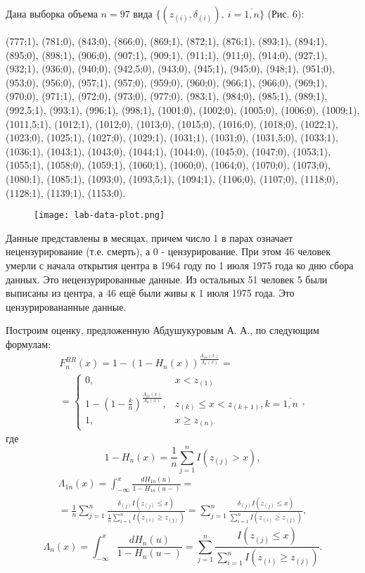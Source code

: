 Дана выборка объема $n = 97$ вида $\{(z_{(i)}, \delta_{(i)}),\ i=\overline{1,n}\}$ (Рис. 6):

(777;1), (781;0), (843;0), (866;0), (869;1), (872;1), (876;1), (893;1), (894;1), (895;0), (898;1), (906;0), (907;1), (909;1), (911;1), (911;0), (914;0), (927;1), (932;1), (936;0), (940;0), (942,5;0), (943;0), (945;1), (945;0), (948;1), (951;0), (953;0), (956;0), (957;1), (957;0), (959;0), (960;0), (966;1), (966;0), (969;1), (970;0), (971;1), (972;0), (973;0), (977;0), (983;1), (984;0), (985;1), (989;1), (992,5;1), (993;1), (996;1), (998;1), (1001;0), (1002;0), (1005;0), (1006;0), (1009;1), (1011,5;1), (1012;1), (1012;0), (1013;0), (1015;0), (1016;0), (1018;0), (1022;1), (1023;0), (1025;1), (1027;0), (1029;1), (1031;1), (1031;0), (1031,5;0), (1033;1), (1036;1), (1043;1), (1043;0), (1044;1), (1044;0), (1045;0), (1047;0), (1053;1), (1055;1), (1058;0), (1059;1), (1060;1), (1060;0), (1064;0), (1070;0), (1073;0), (1080;1), (1085;1), (1093;0), (1093,5;1), (1094;1), (1106;0), (1107;0), (1118;0), (1128;1), (1139;1), (1153;0).

\begin{figure}[h]
    \begin{center}
        \texttt{[image: lab-data-plot.png]}
        \caption{}
        \label{ris:experimcoded}
    \end{center}
\end{figure}

Данные представлены в месяцах, причем число 1 в парах означает нецензурирование (т.е. смерть), а 0 - цензурирование. При этом 46 человек умерли с начала открытия центра в 1964 году по 1 июля 1975 года ко дню сбора данных. Это нецензурированные данные. Из остальных 51 человек 5 были выписаны из центра, а 46 ещё были живы к 1 июля 1975 года. Это цензурировананные данные.

Построим оценку, предложенную Абдушукуровым А. А., по следующим формулам:
\begin{multline*}
    F_n^{RR}(x) = 1 - (1 - H_n(x))^{\frac{\Lambda_{1n}(x)}{\Lambda_n(x)}} = \\ = \left\{ \begin{array}{cl} 0, & x < z_{(1)} \\ 1 - (1 - \frac{k}{n})^{\frac{\Lambda_{1n}(x)}{\Lambda_n(x)}}, & z_{(k)} \le x < z_{(k+1)}, k = \overline{1,n} \\ 1, & x \ge z_{(n)} \end{array} \right.,
\end{multline*}
где
\[
    1 - H_n(x) = \frac{1}{n} \sum_{j=1}^n I(z_{(j)} > x),
\]
\begin{multline*}
    \Lambda_{1n}(x) = \int_{-\infty}^x \frac{dH_{1n}(u)}{1 - H_{1n}(u-)} = \\ = \frac{1}{n} \sum_{j=1}^n \frac{\delta_{(j)} I(z_{(j)} \le x)}{\frac{1}{n} \sum_{i=1}^n I(z_{(i)} \ge z_{(j)})} = \sum_{j=1}^n \frac{\delta_{(j)} I(z_{(j)} \le x)}{\sum_{i=1}^n I(z_{(i)} \ge z_{(j)})},
\end{multline*}
\[
    \Lambda_{n}(x) = \int_{-\infty}^x \frac{dH_n(u)}{1 - H_n(u-)} = \sum_{j=1}^n \frac{I(z_{(j)} \le x)}{\sum_{i=1}^n I(z_{(i)} \ge z_{(j)})}.
\]

